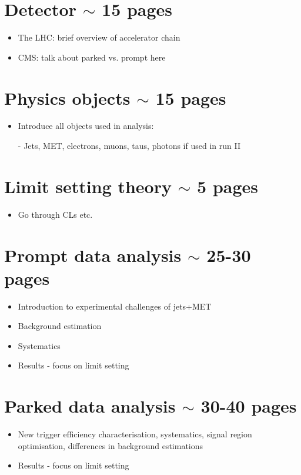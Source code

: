 \documentclass[12pt]{article}
\begin{document}
\section{Detector $\sim$ 15 pages}
\begin{itemize}
\label{sec:detector}
\item The LHC: brief overview of accelerator chain
\item CMS: talk about parked vs. prompt here
\end{itemize}

\section{Physics objects $\sim$ 15 pages}
\begin{itemize}
\label{sec:physobjects}
\item Introduce all objects used in analysis:
\item[-] Jets, MET, electrons, muons, taus, photons if used in run II
\end{itemize}

\section{Limit setting theory $\sim$ 5 pages}
\begin{itemize}
\label{sec:limits}
\item Go through CLs etc.
\end{itemize}

\section{Prompt data analysis $\sim$ 25-30 pages}
\begin{itemize}
\label{sec:promptana}
\item Introduction to experimental challenges of jets+MET
\item Background estimation
\item Systematics
\item Results - focus on limit setting
\end{itemize}

\section{Parked data analysis $\sim$ 30-40 pages}
\begin{itemize}
\label{sec:parkedana}
\item New trigger efficiency characterisation, systematics, signal region optimisation, differences in background estimations
\item Results - focus on limit setting
\end{itemize}
\end{document}
